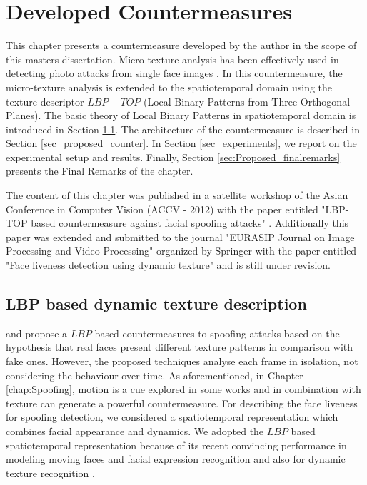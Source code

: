 \chapter{Developed Countermeasures}
\label{chap:Proposed_Countermeasures}

This chapter presents a countermeasure developed by the author in the scope of this masters dissertation. Micro-texture analysis has been effectively used in detecting photo attacks from single face images \citep{bai2010physics,maatta2011face,ChingovskaBIOSIG2012}. In this countermeasure, the micro-texture analysis is extended to the spatiotemporal domain using the texture descriptor $LBP-TOP$ (Local Binary Patterns from Three Orthogonal Planes). The basic theory of Local Binary Patterns in spatiotemporal domain is introduced in Section \ref{sec_dynamic}. The architecture of the countermeasure is described in Section \ref{sec_proposed_counter}. In Section \ref{sec_experiments}, we report on the experimental setup and results. Finally, Section \ref{sec:Proposed_finalremarks} presents the Final Remarks of the chapter.

The content of this chapter was published in a satellite workshop of the Asian Conference in Computer Vision (ACCV - 2012) with the paper entitled "LBP-TOP based countermeasure against facial spoofing attacks" \citep{Pereira_LBP_2012}. Additionally this paper was extended and submitted to the journal "EURASIP Journal on Image Processing and Video Processing" organized by Springer with the paper entitled "Face liveness detection using dynamic texture" and is still under revision.

\section{LBP based dynamic texture description}
\label{sec_dynamic}

\cite{maatta2011face} and \cite{ChingovskaBIOSIG2012} propose a $LBP$ based countermeasures to spoofing attacks based on the hypothesis that real faces  present different texture patterns in comparison with fake ones. 
However, the proposed techniques analyse each frame in isolation, not considering the behaviour over time. 
As aforementioned, in Chapter \ref{chap:Spoofing}, motion is a cue explored in some works and in combination with texture can generate a powerful countermeasure. 
For describing the face liveness for spoofing detection, we considered a spatiotemporal representation which combines facial appearance and dynamics. 
We adopted the $LBP$ based spatiotemporal representation because of its recent convincing performance in modeling moving faces and facial expression recognition and also for dynamic texture recognition \citep{inen2011computer}. 

